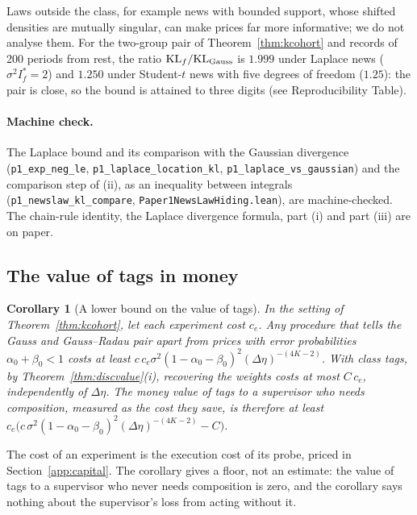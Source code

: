 \documentclass[12pt]{article}
\newtheorem{corollary}[theorem]{Corollary}
\theoremstyle{definition}
\theoremstyle{remark}
\begin{document}
Laws outside the class, for example news with bounded support, whose shifted densities are mutually singular, can make prices far more informative; we do not analyse them. For the two-group pair of Theorem~\ref{thm:kcohort} and records of 200 periods from rest, the ratio $\mathrm{KL}_f/\mathrm{KL}_{\rm Gauss}$ is $1.999$ under Laplace news ($\sigma^2I^*_f=2$) and $1.250$ under Student-$t$ news with five degrees of freedom ($1.25$): the pair is close, so the bound is attained to three digits (see Reproducibility Table).

\paragraph{Machine check.} The Laplace bound and its comparison with the Gaussian divergence (\texttt{p1\_exp\_neg\_le}, \texttt{p1\_laplace\_location\_kl}, \texttt{p1\_laplace\_vs\_gaussian}) and the comparison step of (ii), as an inequality between integrals (\texttt{p1\_newslaw\_kl\_compare}, \nolinkurl{Paper1NewsLawHiding.lean}), are machine-checked. The chain-rule identity, the Laplace divergence formula, part (i) and part (iii) are on paper.

\subsection{The value of tags in money}

\begin{corollary}[A lower bound on the value of tags]\label{cor:money}
In the setting of Theorem~\ref{thm:kcohort}, let each experiment cost $c_e$. Any procedure that tells the Gauss and Gauss--Radau pair apart from prices with error probabilities $\alpha_0+\beta_0<1$ costs at least $c\,c_e\sigma^2(1-\alpha_0-\beta_0)^2(\Delta\eta)^{-(4K-2)}$. With class tags, by Theorem~\ref{thm:discvalue}(i), recovering the weights costs at most $C\,c_e$, independently of $\Delta\eta$. The money value of tags to a supervisor who needs composition, measured as the cost they save, is therefore at least $c_e\bigl(c\,\sigma^2(1-\alpha_0-\beta_0)^2(\Delta\eta)^{-(4K-2)}-C\bigr)$.
\end{corollary}

The cost of an experiment is the execution cost of its probe, priced in Section~\ref{app:capital}. The corollary gives a floor, not an estimate: the value of tags to a supervisor who never needs composition is zero, and the corollary says nothing about the supervisor's loss from acting without it.
\end{document}
